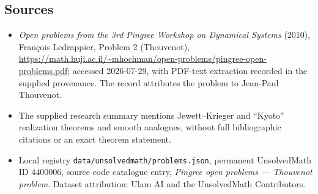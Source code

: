 \documentclass[11pt]{article}
\begin{document}
\subsection{Sources}
\begin{itemize}
\item \emph{Open problems from the 3rd Pingree Workshop on Dynamical Systems} (2010), Fran\c{c}ois Ledrappier, Problem 2 (Thouvenot), \url{https://math.huji.ac.il/~mhochman/open-problems/pingree-open-problems.pdf}; accessed 2026-07-29, with PDF-text extraction recorded in the supplied provenance. The record attributes the problem to Jean-Paul Thouvenot.
\item The supplied research summary mentions Jewett--Krieger and ``Kyoto'' realization theorems and smooth analogues, without full bibliographic citations or an exact theorem statement.
\item Local registry \texttt{data/unsolvedmath/problems.json}, permanent UnsolvedMath ID $4400006$, source code catalogue entry, \emph{Pingree open problems --- Thouvenot problem}. Dataset attribution: Ulam AI and the UnsolvedMath Contributors.
\end{itemize}
\end{document}
